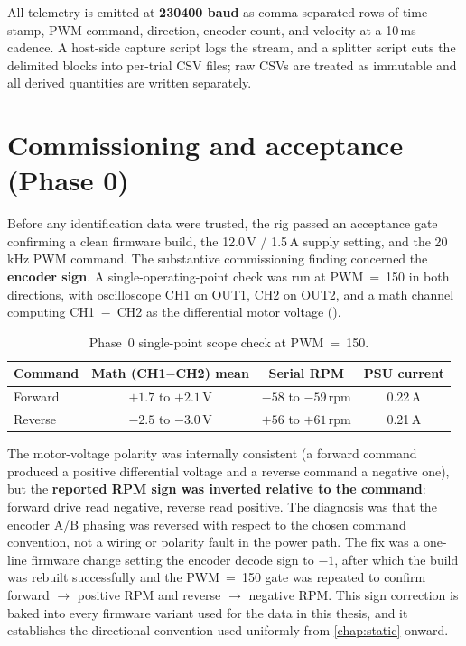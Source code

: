 All telemetry is emitted at \textbf{230400 baud} as comma-separated rows of time stamp, PWM command, direction, encoder count, and velocity at a 10\,ms cadence. A host-side capture script logs the stream, and a splitter script cuts the delimited blocks into per-trial CSV files; raw CSVs are treated as immutable and all derived quantities are written separately.

\section{Commissioning and acceptance (Phase 0)}
\label{sec:commissioning}

Before any identification data were trusted, the rig passed an acceptance gate confirming a clean firmware build, the 12.0\,V / 1.5\,A supply setting, and the 20\,kHz PWM command. The substantive commissioning finding concerned the \textbf{encoder sign}. A single-operating-point check was run at PWM~=~150 in both directions, with oscilloscope CH1 on OUT1, CH2 on OUT2, and a math channel computing CH1~$-$~CH2 as the differential motor voltage ().

\begin{table}[t]
  \centering
  \caption{Phase~0 single-point scope check at PWM~=~150.}
  \label{tab:scopecheck}
  \begin{tabular}{@{}lccc@{}}
    \toprule
    Command & Math (CH1$-$CH2) mean & Serial RPM & PSU current \\
    \midrule
    Forward & $+1.7$ to $+2.1$\,V & $-58$ to $-59$\,rpm & 0.22\,A \\
    Reverse & $-2.5$ to $-3.0$\,V & $+56$ to $+61$\,rpm & 0.21\,A \\
    \bottomrule
  \end{tabular}
\end{table}

The motor-voltage polarity was internally consistent (a forward command produced a positive differential voltage and a reverse command a negative one), but the \textbf{reported RPM sign was inverted relative to the command}: forward drive read negative, reverse read positive. The diagnosis was that the encoder A/B phasing was reversed with respect to the chosen command convention, not a wiring or polarity fault in the power path. The fix was a one-line firmware change setting the encoder decode sign to $-1$, after which the build was rebuilt successfully and the PWM~=~150 gate was repeated to confirm forward $\to$ positive RPM and reverse $\to$ negative RPM. This sign correction is baked into every firmware variant used for the data in this thesis, and it establishes the directional convention used uniformly from \cref{chap:static} onward.

